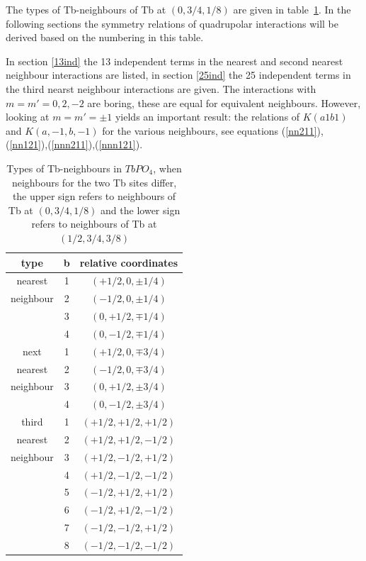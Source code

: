The types of Tb-neighbours of Tb at $(0,3/4,1/8)$ are given in table~\ref{nn}. In the 
following sections the symmetry relations of quadrupolar interactions
will be derived based on the numbering in this table. 

In section \ref{13ind} the 13 independent terms in the nearest and second
nearest neighbour interactions are listed, in section \ref{25ind} the
25 independent terms in the third nearst neighbour interactions are given.
The interactions with $m=m'=0,2,-2$ are boring, these are equal for equivalent 
neighbours. However, looking at $m=m'=\pm1$ yields an important
 result: the relations of $K(a1b1)$ and
$K(a,-1,b,-1)$ for the various neighbours,  see equations
(\ref{nn211}),(\ref{nn121}),(\ref{nnn211}),(\ref{nnn121}).


\begin{table}
\caption{Types of Tb-neighbours in $TbPO_4$, when neighbours for the 
two Tb  sites differ, the upper sign refers to neighbours of Tb at
$(0,3/4,1/8)$  and the lower sign refers to neighbours of Tb at $(1/2,3/4,3/8)$}
\label{nn}\begin{tabular}{c|cc}
type & b & relative coordinates \\
\hline
nearest  & 1 & $(+1/2,0,\pm1/4)$ \\
neighbour & 2 & $(-1/2,0,\pm1/4)$ \\
          & 3 & $(0,+1/2,\mp1/4)$ \\
          & 4 & $(0,-1/2,\mp1/4)$ \\
\hline
next   & 1 & $(+1/2,0,\mp3/4)$ \\
nearest & 2 & $(-1/2,0,\mp3/4)$ \\
neighbour & 3 & $(0,+1/2,\pm3/4)$ \\
          & 4 & $(0,-1/2,\pm3/4)$ \\
\hline
third     & 1  & $(+1/2,+1/2,+1/2)$ \\
nearest   & 2  & $(+1/2,+1/2,-1/2)$ \\
neighbour & 3  & $(+1/2,-1/2,+1/2)$ \\
          & 4  & $(+1/2,-1/2,-1/2)$ \\
          & 5  & $(-1/2,+1/2,+1/2)$ \\
          & 6  & $(-1/2,+1/2,-1/2)$ \\
          & 7  & $(-1/2,-1/2,+1/2)$ \\
          & 8  & $(-1/2,-1/2,-1/2)$ \\
\end{tabular}
\end{table}

